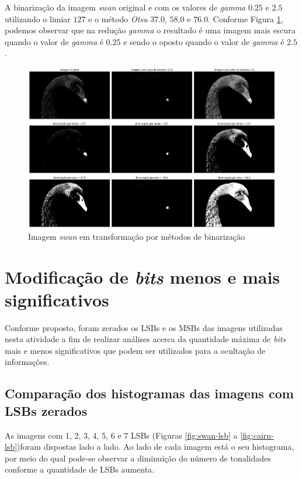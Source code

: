 A binarização da imagem \textit{swan} original e com os valores de \textit{gamma} $0.25$ e $2.5$ utilizando o limiar $127$ e o método \textit{Otsu} $37.0$, $58.0$ e $76.0$.
Conforme Figura \ref{fig:binarizacao-swan}, podemos observar que na redução \textit{gamma} o resultado é uma imagem mais escura quando o valor de \textit{gamma} é $0.25$ e sendo o oposto quando o valor de \textit{gamma} é $2.5$.

\begin{figure}[h!]
    \includegraphics[width=1\linewidth]{Elementos/Figuras/resultados-binarizacao-swan.png}
    \caption{Imagem \textit{swan} em transformação por métodos de binarização}
    \label{fig:binarizacao-swan}
\end{figure}


\section{Modificação de \textit{bits} menos e mais significativos}

Conforme proposto, foram zerados os LSBs e os MSBs das imagens utilizadas nesta atividade a fim de realizar análises acerca da quantidade máxima de \textit{bits} mais e menos significativos que podem ser utilizados para a ocultação de informações.

\subsection{Comparação dos histogramas das imagens com LSBs zerados}

As imagens com 1, 2, 3, 4, 5, 6 e 7 LSBs (Figuras \ref{fig:swan-lsb} a \ref{fig:cairn-lsb})foram dispostas lado a lado.  Ao lado de cada imagem está o seu histograma, por meio do qual pode-se observar a diminuição do número de tonalidades conforme a quantidade de LSBs aumenta. 


